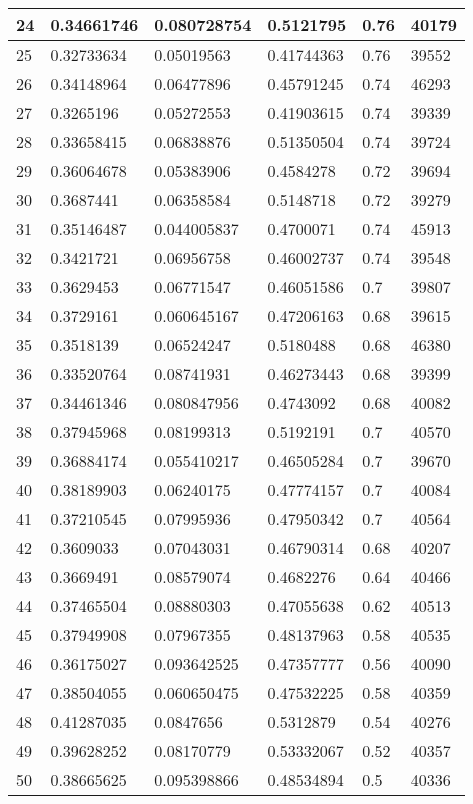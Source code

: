 \begin{longtable}{|l|l|l|l|l|l|}
24 & 0.34661746 & 0.080728754 & 0.5121795 & 0.76 & 40179 \\ \hline 
25 & 0.32733634 & 0.05019563 & 0.41744363 & 0.76 & 39552 \\ \hline 
26 & 0.34148964 & 0.06477896 & 0.45791245 & 0.74 & 46293 \\ \hline 
27 & 0.3265196 & 0.05272553 & 0.41903615 & 0.74 & 39339 \\ \hline 
28 & 0.33658415 & 0.06838876 & 0.51350504 & 0.74 & 39724 \\ \hline 
29 & 0.36064678 & 0.05383906 & 0.4584278 & 0.72 & 39694 \\ \hline 
30 & 0.3687441 & 0.06358584 & 0.5148718 & 0.72 & 39279 \\ \hline 
31 & 0.35146487 & 0.044005837 & 0.4700071 & 0.74 & 45913 \\ \hline 
32 & 0.3421721 & 0.06956758 & 0.46002737 & 0.74 & 39548 \\ \hline 
33 & 0.3629453 & 0.06771547 & 0.46051586 & 0.7 & 39807 \\ \hline 
34 & 0.3729161 & 0.060645167 & 0.47206163 & 0.68 & 39615 \\ \hline 
35 & 0.3518139 & 0.06524247 & 0.5180488 & 0.68 & 46380 \\ \hline 
36 & 0.33520764 & 0.08741931 & 0.46273443 & 0.68 & 39399 \\ \hline 
37 & 0.34461346 & 0.080847956 & 0.4743092 & 0.68 & 40082 \\ \hline 
38 & 0.37945968 & 0.08199313 & 0.5192191 & 0.7 & 40570 \\ \hline 
39 & 0.36884174 & 0.055410217 & 0.46505284 & 0.7 & 39670 \\ \hline 
40 & 0.38189903 & 0.06240175 & 0.47774157 & 0.7 & 40084 \\ \hline 
41 & 0.37210545 & 0.07995936 & 0.47950342 & 0.7 & 40564 \\ \hline 
42 & 0.3609033 & 0.07043031 & 0.46790314 & 0.68 & 40207 \\ \hline 
43 & 0.3669491 & 0.08579074 & 0.4682276 & 0.64 & 40466 \\ \hline 
44 & 0.37465504 & 0.08880303 & 0.47055638 & 0.62 & 40513 \\ \hline 
45 & 0.37949908 & 0.07967355 & 0.48137963 & 0.58 & 40535 \\ \hline 
46 & 0.36175027 & 0.093642525 & 0.47357777 & 0.56 & 40090 \\ \hline 
47 & 0.38504055 & 0.060650475 & 0.47532225 & 0.58 & 40359 \\ \hline 
48 & 0.41287035 & 0.0847656 & 0.5312879 & 0.54 & 40276 \\ \hline 
49 & 0.39628252 & 0.08170779 & 0.53332067 & 0.52 & 40357 \\ \hline 
50 & 0.38665625 & 0.095398866 & 0.48534894 & 0.5 & 40336 \\ \hline 
\end{longtable}